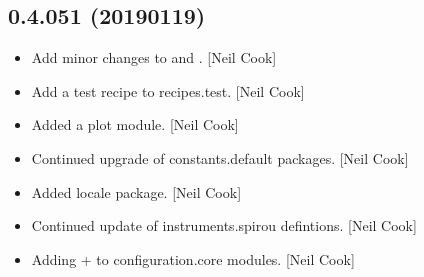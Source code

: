 \documentclass[a4paper,10pt,english]{report}
\begin{document}
\subsection{0.4.051 (2019\sphinxhyphen{}01\sphinxhyphen{}19)}
\label{\detokenize{misc/changelog:id231}}\begin{itemize}
\item {} 
Add minor changes to  and . {[}Neil Cook{]}

\item {} 
Add a test recipe to recipes.test. {[}Neil Cook{]}

\item {} 
Added a plot module. {[}Neil Cook{]}

\item {} 
Continued upgrade of constants.default packages. {[}Neil Cook{]}

\item {} 
Added locale package. {[}Neil Cook{]}

\item {} 
Continued update of instruments.spirou defintions. {[}Neil Cook{]}

\item {} 
Adding  +   to configuration.core modules. {[}Neil
Cook{]}

\end{itemize}
\end{document}
